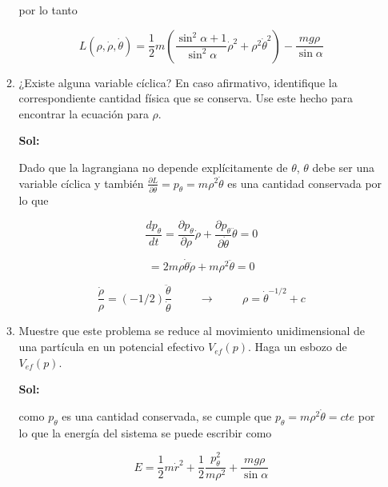 \documentclass[12pt,a4paper]{article}
\begin{document}
\begin{enumerate}
\begin{enumerate}
    por lo tanto
    
    \begin{equation*}
        L (\rho,\dot{\rho}, \dot{\theta})= \frac{1}{2}m \left(\frac{\sin^2{\alpha + 1}}{\sin^2{\alpha}} \dot{\rho}^2 + \rho^2 \dot{\theta}^2\right) - \frac{mg \rho}{\sin{\alpha}}
    \end{equation*}
    
    \item ¿Existe alguna variable cíclica? En caso afirmativo, identifique la correspondiente cantidad física que se conserva. Use este hecho para encontrar la ecuación para $\rho$.
    
    \textbf{Sol:}
    
    Dado que la lagrangiana no depende explícitamente de $\theta$, $\theta$ debe ser una variable cíclica y también $\frac{\partial L}{\partial \dot{\theta}} = p_{\theta} = m \rho^2 \dot{\theta}$ es una cantidad conservada por lo que
    
    \begin{equation*}
        \frac{d p_{\theta}}{d t} = \frac{\partial p_{\theta}}{\partial \rho} \dot{\rho} + \frac{\partial p_{\theta}}{\partial \dot{\theta}} \ddot{\theta}= 0
    \end{equation*}
    
    \begin{equation*}
        = 2m\rho \dot{\theta} \dot{\rho} + m \rho^2 \ddot{\theta} = 0
    \end{equation*}
    
    \begin{equation*}
        \frac{\dot{\rho}}{\rho} =(- 1/2) \frac{\ddot{\theta}}{\dot{\theta}}  \hspace{1cm} \rightarrow \hspace{1cm} \rho = \dot{\theta}^{-1/2} + c
    \end{equation*}
    
    \item Muestre que este problema se reduce al movimiento unidimensional de una partícula en un potencial efectivo $V_{ef} (p)$. Haga un esbozo de $V_{ef}(p)$.
    
    \textbf{Sol:}
    
    como $p_{\theta}$ es una cantidad conservada, se cumple que $p_{\theta} = m \rho^2 \dot{\theta} = cte$ por lo que la energía del sistema se puede escribir como
    
    \begin{equation*}
        E = \frac{1}{2}m \dot{r}^2 + \frac{1}{2} \frac{p_{\theta}^2}{m \rho^2} + \frac{mg \rho}{\sin{\alpha}}
    \end{equation*}
    

\end{enumerate}
\end{enumerate}
\end{document}
